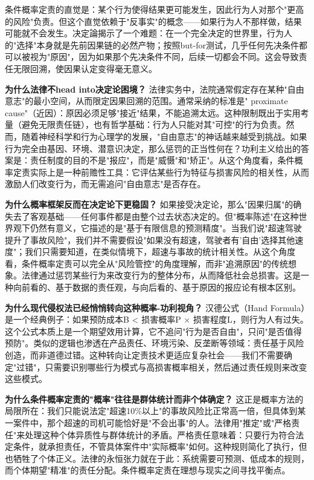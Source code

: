 \documentclass[../main.tex]{subfiles}
\begin{document}
	条件概率定责的直觉是：某个行为使得结果更可能发生，因此行为人对那个"更高的风险"负责。但这个直觉依赖于"反事实"的概念——如果行为人不那样做，结果可能就不会发生。决定論揭示了一个难题：在一个完全决定的世界里，行为人的"选择"本身就是先前因果链的必然产物；按照but-for测试，几乎任何先决条件都可以被视为"原因"，因为如果那个先决条件不同，后续一切都会不同。这会导致责任无限回溯，使因果认定变得毫无意义。
	
	\textbf{为什么法律不head into决定论困境？} 法律实务中，法院通常假定存在某种"自由意志"的最小空间，从而限定因果回溯的范围。通常采纳的标准是" proximate cause"（近因）：原因必须足够"接近"结果，不能追溯太远。这种限制既出于实用考量（避免无限责任链），也有哲学基础：行为人只能对其"可控"的行为负责。然而，随着神经科学和行为心理学的发展，"自由意志"的神话越来越受到挑战。如果行为完全由基因、环境、潜意识决定，那么惩罚的正当性何在？功利主义给出的答案是：责任制度的目的不是"报应"，而是"威慑"和"矫正"。从这个角度看，条件概率定责实际上是一种前赡性工具：它评估某些行为特征与损害风险的相关性，从而激励人们改变行为，而无需追问"自由意志"是否存在。
	
	\textbf{为什么概率框架反而在决定论下更稳固？} 如果接受决定论，那么"因果归属"的确失去了客观基础——任何事件都是由整个过去状态决定的。但"概率陈述"在这种世界观下仍然有意义，它描述的是"基于有限信息的预测精度"。当我们说"超速驾驶提升了事故风险"，我们并不需要假设"如果没有超速，驾驶者有'自由'选择其他速度"；我们只需要知道，在类似情境下，超速与事故的统计相关性。从这个角度看，条件概率定责可以完全从"风险管控"的角度理解，而非"追溯原因"的传统想象。法律通过惩罚某些行为来改变行为的整体分布，从而降低社会总损害。这是一种向前看的、基于数据的责任观，与向后看的、基于原因的报应论有根本区别。
	
	\textbf{为什么现代侵权法已经悄悄转向这种概率-功利视角？} 汉德公式（Hand Formula）是一个经典例子：如果预防成本B < 损害概率P × 损害程度L，则行为人有过失。这个公式本质上是一个期望效用计算，它不追问"行为是否自由"，只问"是否值得预防"。类似的逻辑也渗透在产品责任、环境污染、反垄断等领域：责任基于风险创造，而非道德过错。这种转向让定责技术更适应复杂社会——我们不需要确定"过错"，只需要识别哪些行为模式与高损害概率相关，然后通过责任规则来改变这些模式。
	
	\textbf{为什么条件概率定责的"概率"往往是群体统计而非个体确定？} 这正是概率方法的局限所在：我们只能说法定"超速10\%以上"的事故风险比正常高一倍，但具体到某一案件中，那个超速的司机可能恰好是"不会出事"的人。法律用"推定"或"严格责任"来处理这种个体异质性与群体统计的矛盾。严格责任意味着：只要行为符合法定条件，就承担责任，不管具体案件中"实际概率"如何。这种规则简化了执行，但也牺牲了个体正义。法律的永恒张力就在于此：系统需要可预测、低成本的规则，而个体期望"精准"的责任分配。条件概率定责在理想与现实之间寻找平衡点。
	
\end{document}
